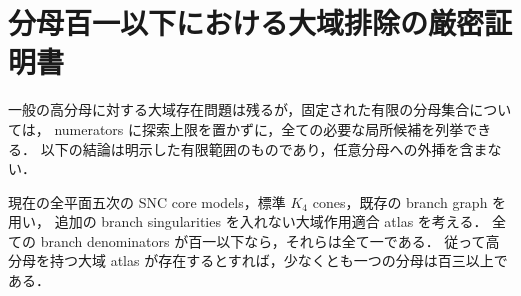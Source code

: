 \section{分母百一以下における大域排除の厳密証明書}
\label{ex10:section}

一般の高分母に対する大域存在問題は残るが，固定された有限の分母集合については，
numerators に探索上限を置かずに，全ての必要な局所候補を列挙できる．
以下の結論は明示した有限範囲のものであり，任意分母への外挿を含まない．

\begin{theorem}[有限分母範囲の排除]\label{ex10:bounded-exclusion}
現在の全平面五次の SNC core models，標準 $K_4$ cones，既存の branch graph を用い，
追加の branch singularities を入れない大域作用適合 atlas を考える．
全ての branch denominators が百一以下なら，それらは全て一である．
従って高分母を持つ大域 atlas が存在するとすれば，少なくとも一つの分母は百三以上である．
\end{theorem}

